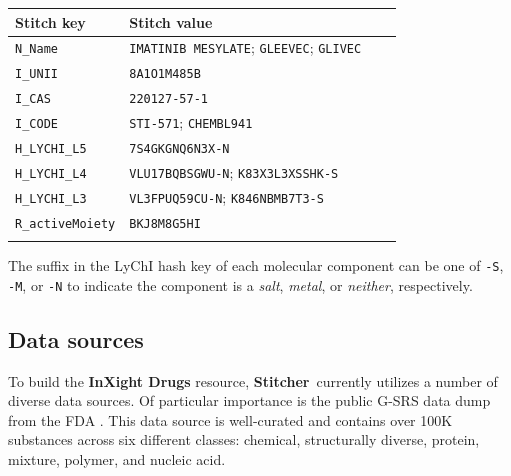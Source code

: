 \documentclass{bioinfo}
\newcommand\st{\textbf{Stitcher}}
\newcommand\ix{\textbf{InXight Drugs}}
\begin{document}
\begin{table}[!t]
{\begin{tabular}{@{}llll@{}}\toprule Stitch key &
Stitch value\\\midrule
\texttt{N\_Name} & \texttt{IMATINIB MESYLATE}; \texttt{GLEEVEC}; \texttt{GLIVEC}\\
\texttt{I\_UNII} & \texttt{8A1O1M485B}\\
\texttt{I\_CAS} & \texttt{220127-57-1}\\
\texttt{I\_CODE} & \texttt{STI-571}; \texttt{CHEMBL941}\\
\texttt{H\_LYCHI\_L5} & \texttt{7S4GKGNQ6N3X-N}\\
\texttt{H\_LYCHI\_L4} & \texttt{VLU17BQBSGWU-N}; \texttt{K83X3L3XSSHK-S}\\
\texttt{H\_LYCHI\_L3} & \texttt{VL3FPUQ59CU-N}; \texttt{K846NBMB7T3-S}\\
\texttt{R\_activeMoiety} & \texttt{BKJ8M8G5HI}\\\botrule
\end{tabular}}{The suffix in the LyChI hash key of each molecular component can be one of \texttt{-S}, \texttt{-M}, or \texttt{-N} to indicate the component is a \emph{salt}, \emph{metal}, or \emph{neither}, respectively.}
\end{table}

\subsection{Data sources}
To build the \ix{} resource, \st\ currently utilizes a number of diverse data sources. Of particular importance is the public G-SRS data dump from the FDA \cite{GSRSData}. This data source is well-curated and contains over 100K substances across six different classes: chemical, structurally diverse, protein, mixture, polymer, and nucleic acid.
\end{document}
